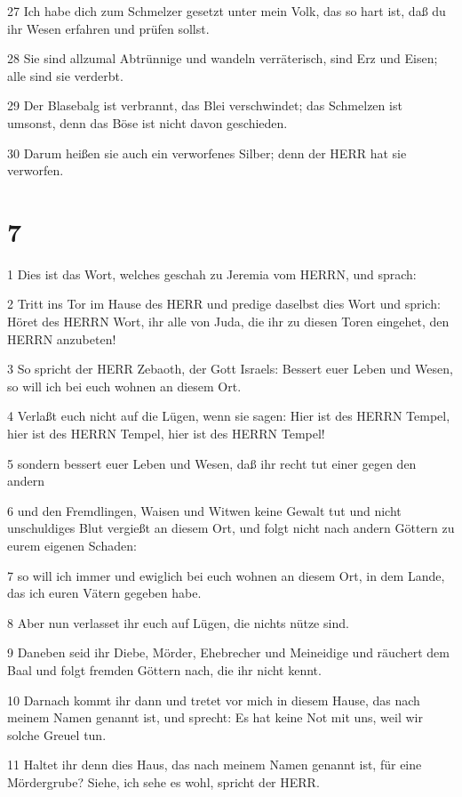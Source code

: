 \par 27 Ich habe dich zum Schmelzer gesetzt unter mein Volk, das so hart ist, daß du ihr Wesen erfahren und prüfen sollst.
\par 28 Sie sind allzumal Abtrünnige und wandeln verräterisch, sind Erz und Eisen; alle sind sie verderbt.
\par 29 Der Blasebalg ist verbrannt, das Blei verschwindet; das Schmelzen ist umsonst, denn das Böse ist nicht davon geschieden.
\par 30 Darum heißen sie auch ein verworfenes Silber; denn der HERR hat sie verworfen.

\chapter{7}

\par 1 Dies ist das Wort, welches geschah zu Jeremia vom HERRN, und sprach:
\par 2 Tritt ins Tor im Hause des HERR und predige daselbst dies Wort und sprich: Höret des HERRN Wort, ihr alle von Juda, die ihr zu diesen Toren eingehet, den HERRN anzubeten!
\par 3 So spricht der HERR Zebaoth, der Gott Israels: Bessert euer Leben und Wesen, so will ich bei euch wohnen an diesem Ort.
\par 4 Verlaßt euch nicht auf die Lügen, wenn sie sagen: Hier ist des HERRN Tempel, hier ist des HERRN Tempel, hier ist des HERRN Tempel!
\par 5 sondern bessert euer Leben und Wesen, daß ihr recht tut einer gegen den andern
\par 6 und den Fremdlingen, Waisen und Witwen keine Gewalt tut und nicht unschuldiges Blut vergießt an diesem Ort, und folgt nicht nach andern Göttern zu eurem eigenen Schaden:
\par 7 so will ich immer und ewiglich bei euch wohnen an diesem Ort, in dem Lande, das ich euren Vätern gegeben habe.
\par 8 Aber nun verlasset ihr euch auf Lügen, die nichts nütze sind.
\par 9 Daneben seid ihr Diebe, Mörder, Ehebrecher und Meineidige und räuchert dem Baal und folgt fremden Göttern nach, die ihr nicht kennt.
\par 10 Darnach kommt ihr dann und tretet vor mich in diesem Hause, das nach meinem Namen genannt ist, und sprecht: Es hat keine Not mit uns, weil wir solche Greuel tun.
\par 11 Haltet ihr denn dies Haus, das nach meinem Namen genannt ist, für eine Mördergrube? Siehe, ich sehe es wohl, spricht der HERR.
